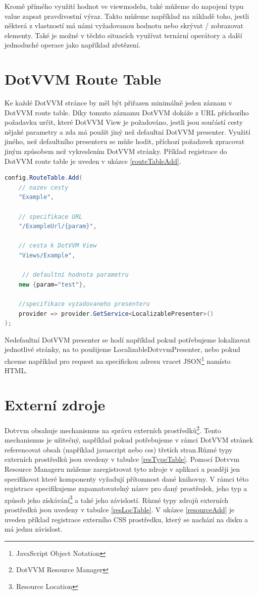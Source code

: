 Kromě přímého využití hodnot ve viewmodelu, také můžeme do napojení typu value zapsat pravdivostní výraz. Takto můžeme například na základě toho, jestli některá z vlastností má námi vyžadovanou hodnotu nebo skrývat / zobrazovat elementy. Také je možné v těchto situacích využívat ternární operátory a další jednoduché operace jako například zřetězení. 
\section{DotVVM Route Table}
Ke každé DotVVM stránce by měl být přiřazen minimálně jeden záznam v DotVVM route table\cite{DotVVM-Routing}. Díky tomuto záznamu DotVVM dokáže z URL příchozího požadavku určit, které DotVVM View je požadováno, jestli jsou součástí cesty nějaké parametry a zda má použít jiný než defaultní DotVVM presenter. Využití jiného, než defaultního presenteru se může hodit, příchozí požadavek zpracovat jiným způsobem než vykreslením DotVVM stránky. Příklad registrace do DotVVM route table je uveden v ukázce \ref{routeTableAdd}.
\begin{lstlisting}[language=C#, caption=Ukázka přidání záznamu do DotVVM route table v rámci DotvvmStartup.cs.,label=routeTableAdd,captionpos=t]
config.RouteTable.Add(
    // nazev cesty
    "Example",
    
    // specifikace URL
    "/ExampleUrl/{param}",
    
    // cesta k DotVVM View
    "Views/Example", 
    
     // defaultní hodnota parametru
    new {param="test"},
    
    //specifikace vyzadovaneho presenteru
    provider => provider.GetService<LocalizablePresenter>()
);
\end{lstlisting}

Nedefaultní DotVVM presenter se hodí například pokud potřebujeme lokalizovat jednotlivé stránky, na to použijeme LocalizableDotvvmPresenter, nebo pokud chceme například pro request na specifickou adresu vracet JSON\footnote{JavaScript Object Notation} namísto HTML.
\section{Externí zdroje}
Dotvvm obsahuje mechanismus na správu externích prostředků\footnote{DotVVM Resource Manager}. Tento mechanismus je užitečný, například pokud potřebujeme v rámci DotVVM stránek referencovat obsah (například javascript nebo css) třetích stran.Různé typy externích prostředků jsou uvedeny v tabulce \ref{resTypeTable}. Pomocí Dotvvm Resource Manageru můžeme zaregistrovat tyto zdroje v aplikaci a později jen specifikovat které komponenty vyžadují přítomnost dané knihovny. V rámci této registrace specifikujeme zapamatovatelný název pro daný prostředek, jeho typ a způsob jeho získávání\footnote{ Resource Location } a také jeho závislostí. Různé typy zdrojů externích prostředků jsou uvedeny v tabulce \ref{resLocTable}.  V ukázce \ref{resourceAdd} je uveden příklad registrace externího CSS prostředku, který se nachází na disku a má jednu závislost.

